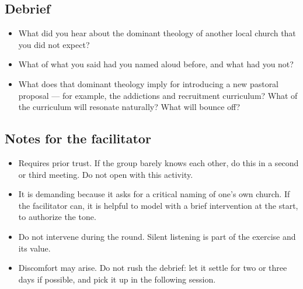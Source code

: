 \documentclass[11pt, a4paper]{article}
\begin{document}
\begin{actividad}
\subsection*{Debrief}
\begin{itemize}
  \item What did you hear about the dominant theology of another local church that you did not expect?
  \item What of what you said had you named aloud before, and what had you not?
  \item What does that dominant theology imply for introducing a new pastoral proposal --- for example, the addictions and recruitment curriculum? What of the curriculum will resonate naturally? What will bounce off?
\end{itemize}

\subsection*{Notes for the facilitator}
\begin{itemize}
  \item Requires prior trust. If the group barely knows each other, do this in a second or third meeting. Do not open with this activity.
  \item It is demanding because it asks for a critical naming of one's own church. If the facilitator can, it is helpful to model with a brief intervention at the start, to authorize the tone.
  \item Do not intervene during the round. Silent listening is part of the exercise and its value.
  \item Discomfort may arise. Do not rush the debrief: let it settle for two or three days if possible, and pick it up in the following session.
\end{itemize}

\end{actividad}

\newpage
\end{document}
